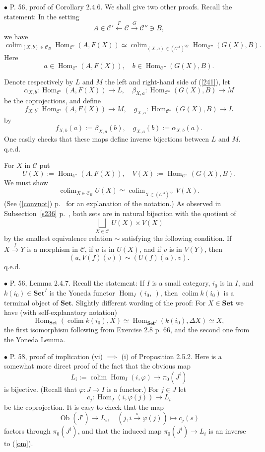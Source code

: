 \documentclass[12pt]{article}
\theoremstyle{remark}%
\newcommand{\bu}{\bullet}
\newcommand{\n}{\noindent}
\newcommand{\C}{\mathcal C}
\newcommand{\Set}{\textbf{Set}}
\newcommand{\p}{\varphi}
\newcommand{\xr}{\xrightarrow}
\newcommand{\be}{\begin{equation}}
\newcommand{\ee}{\end{equation}}
\newcommand{\cn}{(See (\ref{convnot}) p.~\pageref{convnot} for an explanation of the notation.) }
\DeclareMathOperator*{\coli}{colim}
\DeclareMathOperator*{\co}{colim}
\DeclareMathOperator{\Hom}{Hom}
\DeclareMathOperator{\h}{Hom}
\DeclareMathOperator{\Ob}{Ob}
\DeclareMathOperator{\op}{op}
\begin{document}

\n$\bu$ P. 56, proof of Corollary 2.4.6. We shall give two other proofs. Recall the statement: In the setting 
% 
\begin{equation}\label{241s}
A\in\C'\xleftarrow{F}\C\xrightarrow{G}\C''\ni B, 
\end{equation} 
% 
we have 
% 
\begin{equation}\label{241} 
\coli_{(X,b)\in\C_B}\Hom_{\C'}(A,F(X))\simeq 
\coli_{(X,a)\in(\C^A)^{\op}}\Hom_{\C''}(G(X),B). 
\end{equation} 
% 
Here  
$$
a\in\Hom_{\C'}(A,F(X)),\quad b\in\Hom_{\C''}(G(X),B). 
$$ 

\n{\em First proof.} Denote respectively by $L$ and $M$ the left and right-hand side of (\ref{241}), let 
$$
\alpha_{X,b}:\Hom_{\C'}(A,F(X))\to L,\quad\beta_{X,a}:\Hom_{\C''}(G(X),B)\to M
$$
be the coprojections, and define 
$$
f_{X,b}:\Hom_{\C'}(A,F(X))\to M,\quad g_{X,a}:\Hom_{\C''}(G(X),B)\to L
$$
by
$$
f_{X,b}(a):=\beta_{X,a}(b),\quad g_{X,a}(b):=\alpha_{X,b}(a).
$$
One easily checks that these maps define inverse bijections between $L$ and $M$. q.e.d. 

\n{\em Second proof.} For $X$ in $\C$ put 
% 
\be\label{p2}
U(X):=\h_{\C'}(A,F(X)),\quad V(X):=\h_{\C''}(G(X),B). 
\ee
% 
We must show 
$$
\co_{X\in\C_B}U(X)\simeq\co_{X\in(\C^A)^{\op}}V(X). 
$$ 
\cn As observed in Subsection~\ref{s236} p.~\pageref{s236}, both sets are in natural bijection with the quotient of 
$$
\bigsqcup_{X\in\C}\ U(X)\times V(X) 
$$ 
by the smallest equivalence relation $\sim$ satisfying the following condition. If $X\xr fY$ is a morphism in $\C$, if $u$ is in $U(X)$, and if $v$ is in $V(Y)$, then 
$$
(u,V(f)(v))\sim(U(f)(u),v). 
$$ 
q.e.d. 


\n$\bu$ P. 56, Lemma 2.4.7. Recall the statement: If $I$ is a small category, $i_0$ is in $I$, and $k(i_0)\in\Set^I$ is the Yoneda functor $\Hom_I(i_0,\ )$, then $\coli k(i_0)$ is a terminal object of $\Set$. Slightly different wording of the proof: For $X\in\Set$ we have (with self-explanatory notation)
$$
\Hom_{\Set}\left(\coli k(i_0),X\right)\simeq\Hom_{{\Set}^I}(k(i_0),\Delta X)\simeq X,
$$
the first isomorphism following from Exercise 2.8 p. 66, and the second one from the Yoneda Lemma. 

% 

\n$\bu$ P. 58, proof of implication (vi) $\implies$ (i) of Proposition 2.5.2. Here is a somewhat more direct proof of the fact that the obvious map  
\begin{equation}\label{om}
L_i:=\coli\Hom_I(i,\p)\to\pi_0(J^i)
\end{equation}
is bijective. (Recall that $\p:J\to I$ is a functor.) For $j\in J$ let 
$$
c_j:\Hom_I(i,\p(j))\to L_i
$$
be the coprojection. It is easy to check that the map 
$$
\Ob(J^i)\to L_i,\quad (j,i\overset{s}{\to}\p(j))\mapsto c_j(s)
$$
factors through $\pi_0(J^i)$, and that the induced map $\pi_0(J^i)\to L_i$ is an inverse to (\ref{om}). 
\end{document}
